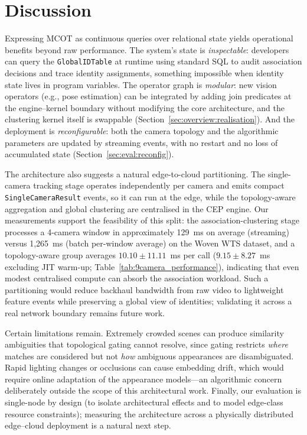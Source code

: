 \documentclass[review]{elsarticle}
\begin{document}
\section{Discussion}\label{sec:discussion}

Expressing MCOT as continuous queries over relational state yields operational benefits beyond
raw performance. The system's state is \emph{inspectable}: developers can query the
\texttt{GlobalIDTable} at runtime using standard SQL to audit association decisions and trace
identity assignments, something impossible when identity state lives in program variables. The
operator graph is \emph{modular}: new vision operators (e.g., pose estimation) can be
integrated by adding join predicates at the engine--kernel boundary without modifying the core
architecture, and the clustering kernel itself is swappable
(Section~\ref{sec:overview:realisation}). And the deployment is \emph{reconfigurable}: both
the camera topology and the algorithmic parameters are updated by streaming events, with no
restart and no loss of accumulated state (Section~\ref{sec:eval:reconfig}).

The architecture also suggests a natural edge-to-cloud partitioning. The single-camera
tracking stage operates independently per camera and emits compact
\texttt{SingleCameraResult} events, so it can run at the edge, while the topology-aware
aggregation and global clustering are centralised in the CEP engine. Our measurements support
the feasibility of this split: the association-clustering stage processes a 4-camera window in
approximately 129~ms on average (streaming) versus 1{,}265~ms (batch per-window average) on
the Woven WTS dataset, and a topology-aware group averages $10.10 \pm 11.11$~ms per call
($9.15 \pm 8.27$~ms excluding JIT warm-up; Table~\ref{tab:9camera_performance}), indicating
that even modest centralised compute can absorb the association workload. Such a partitioning
would reduce backhaul bandwidth from raw video to lightweight feature events while preserving
a global view of identities; validating it across a real network boundary remains future
work.

Certain limitations remain. Extremely crowded scenes can produce similarity ambiguities that
topological gating cannot resolve, since gating restricts \emph{where} matches are considered
but not \emph{how} ambiguous appearances are disambiguated. Rapid lighting changes or
occlusions can cause embedding drift, which would require online adaptation of the appearance
models---an algorithmic concern deliberately outside the scope of this architectural work.
Finally, our evaluation is single-node by design (to isolate architectural effects and to
model edge-class resource constraints); measuring the architecture across a physically
distributed edge--cloud deployment is a natural next step.
\end{document}
